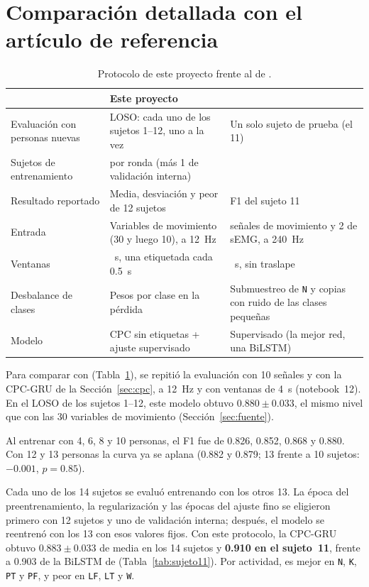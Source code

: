 \documentclass[letterpaper,11pt]{article}
\newcommand{\act}[1]{\texttt{#1}}
\begin{document}
\section{Comparación detallada con el artículo de referencia}
\label{anx:bassani}
\begin{table}[H]
  \centering
  \small
  \caption{Protocolo de este proyecto frente al de \textcite{bassani2025}.}
  \label{tab:protocolos}
  \begin{tabular}{>{\raggedright\arraybackslash}p{3.2cm}>{\raggedright\arraybackslash}p{5.4cm}>{\raggedright\arraybackslash}p{5.4cm}}
    \toprule
    & Este proyecto & \textcite{bassani2025} \\
    \midrule
    Evaluación con personas nuevas & LOSO: cada uno de los sujetos 1--12, uno a la vez & Un solo sujeto de prueba (el 11) \\
    Sujetos de entrenamiento & 10 por ronda (más 1 de validación interna) & 13 \\
    Resultado reportado & Media, desviación y peor de 12 sujetos & F1 del sujeto 11 \\
    Entrada & Variables de movimiento (30 y luego 10), a 12~Hz & 8 señales de movimiento y 2 de sEMG, a 240~Hz \\
    Ventanas & 4~s, una etiquetada cada 0.5~s & 1~s, sin traslape \\
    Desbalance de clases & Pesos por clase en la pérdida & Submuestreo de \act{N} y copias con ruido de las clases pequeñas \\
    Modelo & CPC sin etiquetas + ajuste supervisado & Supervisado (la mejor red, una BiLSTM) \\
    \bottomrule
  \end{tabular}
\end{table}

Para comparar con \textcite{bassani2025} (Tabla~\ref{tab:protocolos}), se repitió la evaluación con 10 señales y con la CPC-GRU de la Sección~\ref{sec:cpc}, a 12~Hz y con ventanas de 4~s (notebook~12). En el LOSO de los sujetos 1--12, este modelo obtuvo $0.880 \pm 0.033$, el mismo nivel que con las 30 variables de movimiento (Sección~\ref{sec:fuente}).

Al entrenar con 4, 6, 8 y 10 personas, el F1 fue de 0.826, 0.852, 0.868 y 0.880. Con 12 y 13 personas la curva ya se aplana (0.882 y 0.879; 13 frente a 10 sujetos: $-0.001$, $p = 0.85$).

Cada uno de los 14 sujetos se evaluó entrenando con los otros 13. La época del preentrenamiento, la regularización y las épocas del ajuste fino se eligieron primero con 12 sujetos y uno de validación interna; después, el modelo se reentrenó con los 13 con esos valores fijos. Con este protocolo, la CPC-GRU obtuvo $0.883 \pm 0.033$ de media en los 14 sujetos y \textbf{0.910 en el sujeto~11}, frente a 0.903 de la BiLSTM de \textcite{bassani2025} (Tabla~\ref{tab:sujeto11}). Por actividad, es mejor en \act{N}, \act{K}, \act{PT} y \act{PF}, y peor en \act{LF}, \act{LT} y \act{W}.
\end{document}
